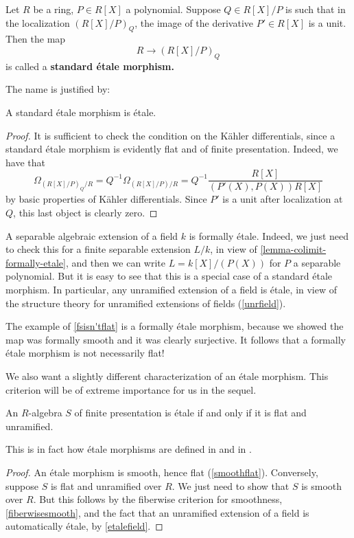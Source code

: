 \begin{example} 
Let $R$ be a ring, $P \in R[X]$ a polynomial. Suppose $Q \in R[X]/P$ is such that in the
localization $(R[X]/P)_Q$, the image of the derivative $P' \in R[X]$ is a unit. Then the map
\[ R \to (R[X]/P)_Q  \]
is called a \textbf{standard \'etale morphism.}
\end{example} 



The name is justified by:
\begin{proposition} 
A standard \'etale morphism is \'etale.
\end{proposition} 
\begin{proof} 
It is sufficient to check the condition on the K\"ahler differentials, since a
standard \'etale morphism is evidently flat and of finite presentation. 
Indeed, we have that
\[ \Omega_{(R[X]/P)_Q/R} = Q^{-1} \Omega_{(R[X]/P)/R} = Q^{-1}
\frac{R[X]}{(P'(X), P(X)) R[X]}  \]
by basic properties of K\"ahler differentials. Since $P'$ is a unit after
localization at $Q$, this last object is clearly zero. 
\end{proof} 

\begin{example} \label{etalefield}
A separable algebraic extension of a field  $k$ is formally \'etale. 
Indeed, we just need to check this 
for a finite separable extension $L/k$, in view of \cref{lemma-colimit-formally-etale}, and then we can write $L = k[X]/(P(X))$
for $P$ a separable polynomial. But it is easy to see that this is a special
case of a standard \'etale morphism.
In particular, any unramified extension of a field is \'etale, in view of the
structure theory for unramified extensions of fields (\cref{unrfield}).
\end{example} 


\begin{example} 
The example of \cref{fsisn'tflat} is a formally \'etale morphism, because we
showed the map was formally smooth and it was clearly surjective. 
It follows that a formally \'etale morphism is not necessarily flat!
\end{example} 


We also want a slightly different characterization of an \'etale morphism. This
criterion will be of extreme importance for us in the sequel.
\begin{theorem} 
An $R$-algebra $S$ of finite presentation is \'etale if and only if
it is flat and unramified.
\end{theorem} 
This is in fact how \'etale morphisms are defined in \cite{SGA1} and in
\cite{Ha77}.
\begin{proof} 
An \'etale morphism is smooth, hence flat (\cref{smoothflat}). Conversely,
suppose $S$ is flat and unramified over $R$. We just need to show that $S$ is
smooth over $R$. But this follows by the fiberwise criterion for smoothness,
\cref{fiberwisesmooth}, and the fact that an unramified extension of a
field is automatically \'etale, by \cref{etalefield}.
\end{proof} 


